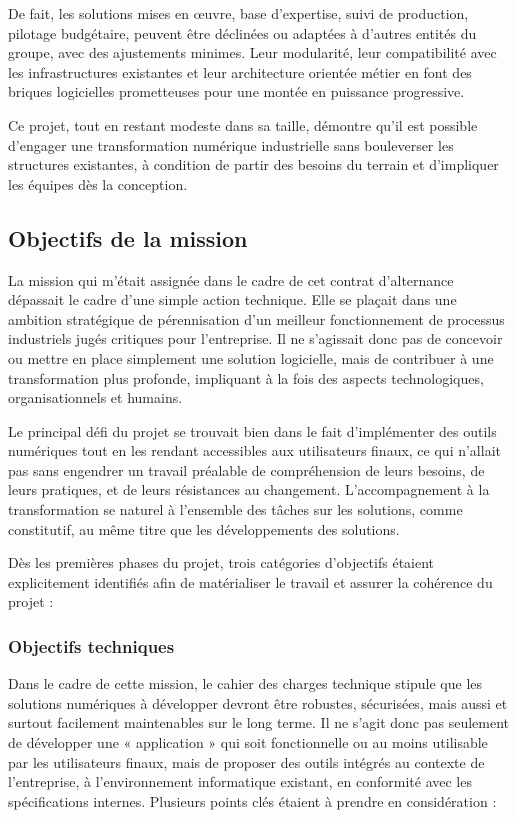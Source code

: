\documentclass[11pt,a4paper]{article}
\begin{document}
De fait, les solutions mises en œuvre, base d’expertise, suivi de production, pilotage budgétaire, peuvent être déclinées ou adaptées à d’autres entités du groupe, avec des ajustements minimes. Leur modularité, leur compatibilité avec les infrastructures existantes et leur architecture orientée métier en font des briques logicielles prometteuses pour une montée en puissance progressive.

Ce projet, tout en restant modeste dans sa taille, démontre qu’il est possible d’engager une transformation numérique industrielle sans bouleverser les structures existantes, à condition de partir des besoins du terrain et d’impliquer les équipes dès la conception.

\subsection{Objectifs de la mission}

La mission qui m’était assignée dans le cadre de cet contrat d'alternance dépassait le cadre d’une simple action technique. Elle se plaçait dans une ambition stratégique de pérennisation d’un meilleur fonctionnement de processus industriels jugés critiques pour l’entreprise. Il ne s’agissait donc pas de concevoir ou mettre en place simplement une solution logicielle, mais de contribuer à une transformation plus profonde, impliquant à la fois des aspects technologiques, organisationnels et humains.

Le principal défi du projet se trouvait bien dans le fait d’implémenter des outils numériques tout en les rendant accessibles aux utilisateurs finaux, ce qui n’allait pas sans engendrer un travail préalable de compréhension de leurs besoins, de leurs pratiques, et de leurs résistances au changement. L’accompagnement à la transformation se naturel à l’ensemble des tâches sur les solutions, comme constitutif, au même titre que les développements des solutions.

Dès les premières phases du projet, trois catégories d’objectifs étaient explicitement identifiés afin de matérialiser le travail et assurer la cohérence du projet :

\subsubsection{Objectifs techniques}

Dans le cadre de cette mission, le cahier des charges technique stipule que les solutions numériques à développer devront être robustes, sécurisées, mais aussi et surtout facilement maintenables sur le long terme. Il ne s’agit donc pas seulement de développer une « application » qui soit fonctionnelle ou au moins utilisable par les utilisateurs finaux, mais de proposer des outils intégrés au contexte de l’entreprise, à l’environnement informatique existant, en conformité avec les spécifications internes. Plusieurs points clés étaient à prendre en considération :
\end{document}
